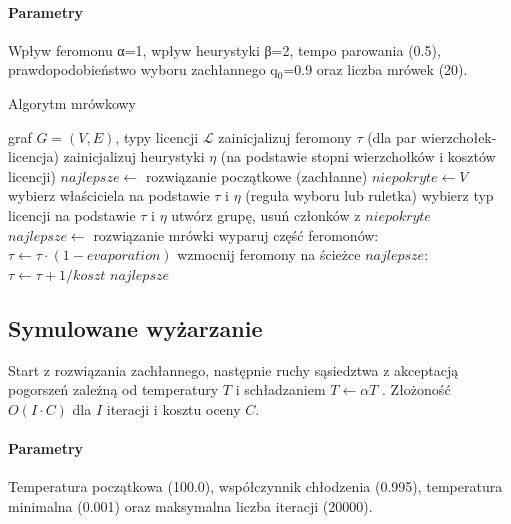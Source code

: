 \paragraph{Parametry}
Wpływ feromonu α=1, wpływ heurystyki β=2, tempo parowania (0.5), prawdopodobieństwo wyboru zachłannego q$_0$=0.9 oraz liczba mrówek (20).

\begin{algorithm}[H]
\caption{Algorytm mrówkowy}
\label{alg:aco}
\begin{algorithmic}[1]
\Require graf $G=(V,E)$, typy licencji $\mathcal{L}$
\State zainicjalizuj feromony $\tau$ (dla par wierzchołek-licencja)
\State zainicjalizuj heurystyki $\eta$ (na podstawie stopni wierzchołków i kosztów licencji)
\State $najlepsze \gets$ rozwiązanie początkowe (zachłanne)
    \State $niepokryte \gets V$
      \State wybierz właściciela na podstawie $\tau$ i $\eta$ (reguła wyboru lub ruletka)
      \State wybierz typ licencji na podstawie $\tau$ i $\eta$
      \State utwórz grupę, usuń członków z $niepokryte$
    \EndWhile
      \State $najlepsze \gets$ rozwiązanie mrówki
    \EndIf
  \EndFor
  \State wyparuj część feromonów: $\tau \gets \tau \cdot (1-evaporation)$
  \State wzmocnij feromony na ścieżce $najlepsze$: $\tau \gets \tau + 1/koszt$
\EndFor
\State \Return $najlepsze$
\end{algorithmic}
\end{algorithm}

\subsection{Symulowane wyżarzanie }\label{subsec:sa}
Start z rozwiązania zachłannego, następnie ruchy sąsiedztwa z akceptacją pogorszeń zależną od temperatury \(T\) i schładzaniem \(T\leftarrow \alpha T\) \cite{kirkpatrick1983}. Złożoność \(O(I\cdot C)\) dla \(I\) iteracji i kosztu oceny \(C\).

\paragraph{Parametry}
Temperatura początkowa (100.0), współczynnik chłodzenia (0.995), temperatura minimalna (0.001) oraz maksymalna liczba iteracji (20000).

